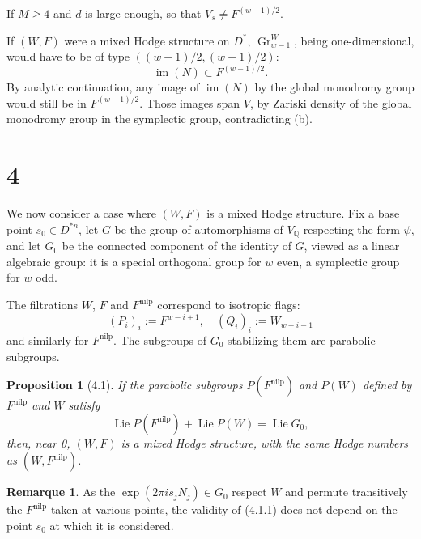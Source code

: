 \documentclass[11pt,a4paper]{article}
\theoremstyle{plain}
\newtheorem{proposition}[theorem]{Proposition}
\theoremstyle{definition}
\newtheorem{remark}[theorem]{Remarque}
\DeclareMathOperator{\Gr}{Gr}
\DeclareMathOperator{\im}{im}
\DeclareMathOperator{\Lie}{Lie}
\begin{document}
If $M \geq 4$ and $d$ is large enough, so that $V_{s} \neq F^{(w-1)/2}$.

If $(W, F)$ were a mixed Hodge structure on $D^{*}$, $\Gr_{w-1}^{W}$, being one-dimensional, would have to be of type $((w-1)/2, (w-1)/2)$:
\[
\im(N) \subset F^{(w-1)/2}.
\]
By analytic continuation, any image of $\im(N)$ by the global monodromy group would still be in $F^{(w-1)/2}$. Those images span $V$, by Zariski density of the global monodromy group in the symplectic group, contradicting (b).

\section{4}

We now consider a case where $(W, F)$ is a mixed Hodge structure. Fix a base point $s_{0} \in D^{*n}$, let $G$ be the group of automorphisms of $V_{\mathbb{Q}}$ respecting the form $\psi$, and let $G_{0}$ be the connected component of the identity of $G$, viewed as a linear algebraic group: it is a special orthogonal group for $w$ even, a symplectic group for $w$ odd.

The filtrations $W$, $F$ and $F^{\text{nilp}}$ correspond to isotropic flags:
\[
(P_{i})_{i} := F^{w-i+1}, \quad (Q_{i})_{i} := W_{w+i-1}
\]
and similarly for $F^{\text{nilp}}$. The subgroups of $G_{0}$ stabilizing them are parabolic subgroups.

\begin{proposition}[4.1]
If the parabolic subgroups $P(F^{\text{nilp}})$ and $P(W)$ defined by $F^{\text{nilp}}$ and $W$ satisfy
\begin{equation}
\Lie P(F^{\text{nilp}}) + \Lie P(W) = \Lie G_{0}, \tag{4.1.1}
\end{equation}
then, near 0, $(W, F)$ is a mixed Hodge structure, with the same Hodge numbers as $(W, F^{\text{nilp}})$.
\end{proposition}

\begin{remark}
As the $\exp(2\pi is_{j}N_{j}) \in G_{0}$ respect $W$ and permute transitively the $F^{\text{nilp}}$ taken at various points, the validity of (4.1.1) does not depend on the point $s_{0}$ at which it is considered.
\end{remark}
\end{document}

